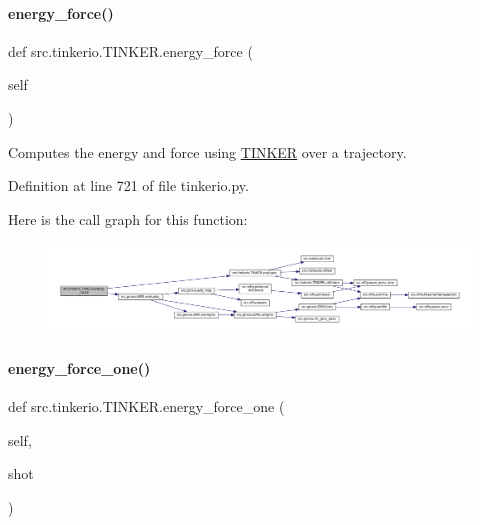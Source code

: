 \paragraph{\texorpdfstring{energy\+\_\+force()}{energy\_force()}}
{\footnotesize\ttfamily def src.\+tinkerio.\+T\+I\+N\+K\+E\+R.\+energy\+\_\+force (\begin{DoxyParamCaption}\item[{}]{self }\end{DoxyParamCaption})}



Computes the energy and force using \hyperlink{classsrc_1_1tinkerio_1_1TINKER}{T\+I\+N\+K\+ER} over a trajectory. 



Definition at line 721 of file tinkerio.\+py.

Here is the call graph for this function\+:
\nopagebreak
\begin{figure}[H]
\begin{center}
\leavevmode
\includegraphics[width=350pt]{classsrc_1_1tinkerio_1_1TINKER_aaa2119b507c4840ed931f1987a133222_cgraph}
\end{center}
\end{figure}
\mbox{\label{classsrc_1_1tinkerio_1_1TINKER_a99b420aae7470e1fb25ba0837ee7ef16}} 
\paragraph{\texorpdfstring{energy\+\_\+force\+\_\+one()}{energy\_force\_one()}}
{\footnotesize\ttfamily def src.\+tinkerio.\+T\+I\+N\+K\+E\+R.\+energy\+\_\+force\+\_\+one (\begin{DoxyParamCaption}\item[{}]{self,  }\item[{}]{shot }\end{DoxyParamCaption})}



